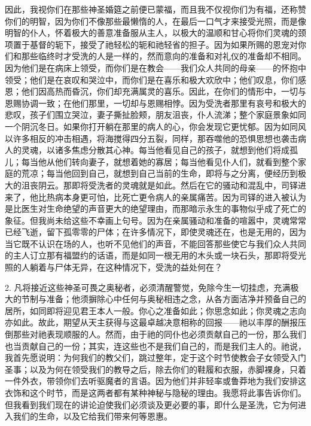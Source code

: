 因此，我视你们在那些神圣婚筵之前便已蒙福，而且我不仅视你们为有福，还称赞你们的明智，因为你们不像那些最懒惰的人，在最后一口气才来接受光照，而是像明智的仆人，怀着极大的善意准备服从主人，以极大的温顺和甘心将你们灵魂的颈项置于基督的轭下，接受了祂轻松的轭和祂轻省的担子。因为如果所赐的恩宠对你们和那些临终时才受洗的人是一样的，然而意向的准备和对礼仪的准备却不相同。因为他们是在病床上领受，而你们是在教会——我们众人共同的母亲——的怀抱中领受；他们是在哀叹和哭泣中，而你们是在喜乐和极大欢欣中；他们叹息，你们感恩；他们因高热而昏沉，你们却充满属灵的喜乐。因此，在你们的情形中，一切与恩赐协调一致；在他们那里，一切却与恩赐相悖。因为受洗者那里有哀号和极大的悲叹，孩子们围立哭泣，妻子撕扯脸颊，朋友沮丧，仆人流涕；整个家庭景象如同一个阴沉冬日。如果你打开躺在那里的病人的心，你会发现它更忧郁。因为如同风以许多相反的冲击相遇，将海搅得四分五裂，同样，那吞噬他的恐惧思想也袭击病人的灵魂，以诸多焦虑分散其心神。每当他看见自己的孩子，就想到他们将成孤儿；每当他从他们转向妻子，就想着她的寡居；每当他看见仆人们，就看到整个家庭的荒凉；每当他回到自己，就想到自己当前的生命，即将与之分离，便经历到极大的沮丧阴云。那即将受洗者的灵魂就是如此。然后在它的骚动和混乱中，司铎进来了，他比热病本身更可怕，比死亡更令病人的亲属痛苦。因为司铎的进入被认为是比医生对生命绝望的声音更大的绝望理由，而那暗示永生的事物似乎成了死亡的象征。但我尚未给这些不幸画上句号。因为在亲属骚动和准备的喧嚣中，灵魂常常已经飞逝，留下孤零零的尸体；在许多情况下，即使灵魂还在，也是无用的，因为当它既不认识在场的人，也听不见他们的声音，不能回答那些使它与我们众人共同的主人订立那有福盟约的话语，而是如同一根无用的木头或一块石头，那即将受光照的人躺着与尸体无异，在这种情况下，受洗的益处何在？\par

2. 凡将接近这些神圣可畏之奥秘者，必须清醒警觉，免除今生一切挂虑，充满极大的节制与准备；他须摒除心中任何与奥秘相违之念，从各方面洁净并预备自己的居所，如同即将迎见君王本人一般。你心之准备如此；你思念如此；你灵魂之志向亦如此。故此，期望从天主获得与这最卓越决意相称的回报——祂以丰厚的酬报压倒那些对祂表现顺服的人。然而，由于祂的同仆也必须贡献自己的一份，那么我们也当贡献自己的一份；其实，连这些也不是我们自己的，而是我们主人的。祂说，  我首先愿说明：为何我们的教父们，跳过整年，定于这个时节使教会子女领受入门圣事；以及为何在领受我们的教导之后，除去你们的鞋履和衣服，赤脚裸身，只着一件外衣，带领你们去听驱魔者的言语。因为他们并非轻率或鲁莽地为我们安排这衣饰和这个时节，而是这两者都有某种神秘与隐秘的理由。我愿将此事告诉你们。但我看到我们现在的讲论迫使我们必须谈及更必要的事，即什么是圣洗，它为何进入我们的生命，以及它给我们带来何等恩惠。\par

